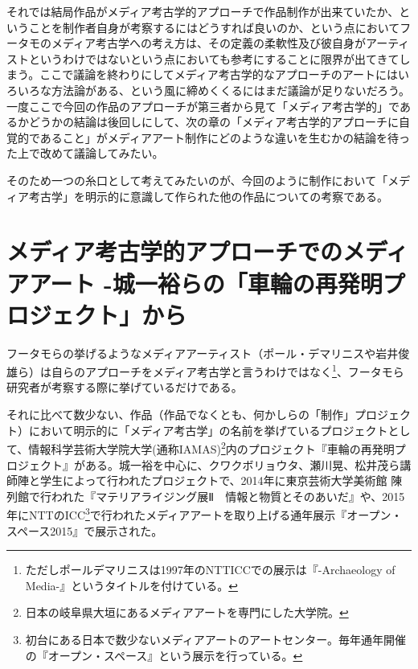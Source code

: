 \documentclass[a4paper,report]{jsbook}
\begin{document}
それでは結局作品がメディア考古学的アプローチで作品制作が出来ていたか、ということを制作者自身が考察するにはどうすれば良いのか、という点においてフータモのメディア考古学への考え方は、その定義の柔軟性及び彼自身がアーティストというわけではないという点においても参考にすることに限界が出てきてしまう。ここで議論を終わりにしてメディア考古学的なアプローチのアートにはいろいろな方法論がある、という風に締めくくるにはまだ議論が足りないだろう。\\
一度ここで今回の作品のアプローチが第三者から見て「メディア考古学的」であるかどうかの結論は後回しにして、次の章の「メディア考古学的アプローチに自覚的であること」がメディアアート制作にどのような違いを生むかの結論を待った上で改めて議論してみたい。

そのため一つの糸口として考えてみたいのが、今回のように制作において「メディア考古学」を明示的に意識して作られた他の作品についての考察である。

\section{メディア考古学的アプローチでのメディアアート
-城一裕らの「車輪の再発明プロジェクト」から}\label{ux30e1ux30c7ux30a3ux30a2ux8003ux53e4ux5b66ux7684ux30a2ux30d7ux30edux30fcux30c1ux3067ux306eux30e1ux30c7ux30a3ux30a2ux30a2ux30fcux30c8--ux57ceux4e00ux88d5ux3089ux306eux8ecaux8f2aux306eux518dux767aux660eux30d7ux30edux30b8ux30a7ux30afux30c8ux304bux3089}

フータモらの挙げるようなメディアアーティスト（ポール・デマリニスや岩井俊雄ら）は自らのアプローチをメディア考古学と言うわけではなく\footnote{ただしポールデマリニスは1997年のNTTICCでの展示は『-Archaeology
  of Media-』というタイトルを付けている。}、フータモら研究者が考察する際に挙げているだけである。

それに比べて数少ない、作品（作品でなくとも、何かしらの「制作」プロジェクト）において明示的に「メディア考古学」の名前を挙げているプロジェクトとして、情報科学芸術大学院大学(通称IAMAS)\footnote{日本の岐阜県大垣にあるメディアアートを専門にした大学院。}内のプロジェクト『車輪の再発明プロジェクト』がある。城一裕を中心に、クワクボリョウタ、瀬川晃、松井茂ら講師陣と学生によって行われたプロジェクトで、2014年に東京芸術大学美術館
陳列館で行われた『マテリアライジング展Ⅱ　情報と物質とそのあいだ』や、2015年にNTTのICC\footnote{初台にある日本で数少ないメディアアートのアートセンター。毎年通年開催の『オープン・スペース』という展示を行っている。}で行われたメディアアートを取り上げる通年展示『オープン・スペース2015』で展示された。\autocites{iamas:RIWP}{mtrlzng:RIWP}
\end{document}
